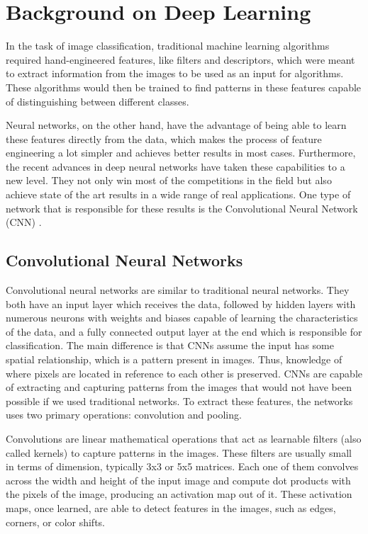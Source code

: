 \chapter{Background on Deep Learning}

In the task of image classification, traditional machine learning algorithms required hand-engineered features, like filters and descriptors, which were meant to extract information from the images to be used as an input for algorithms. These algorithms would then be trained to find patterns in these features capable of distinguishing between different classes.

Neural networks, on the other hand, have the advantage of being able to learn these features directly from the data, which makes the process of feature engineering a lot simpler and achieves better results in most cases. Furthermore, the recent advances in deep neural networks have taken these capabilities to a new level. They not only win most of the competitions in the field but also achieve state of the art results in a wide range of real applications. One type of network that is responsible for these results is the Convolutional Neural Network (CNN) \citep{Lecun1998}.

\section{Convolutional Neural Networks}

Convolutional neural networks are similar to traditional neural networks. They both have an input layer which receives the data, followed by hidden layers with numerous neurons with weights and biases capable of learning the characteristics of the data, and a fully connected output layer at the end which is responsible for classification. The main difference is that CNNs assume the input has some spatial relationship, which is a pattern present in images. Thus, knowledge of where pixels are located in reference to each other is preserved. CNNs are capable of extracting and capturing patterns from the images that would not have been possible if we used traditional networks. To extract these features, the networks uses two primary operations: convolution and pooling.

Convolutions are linear mathematical operations that act as learnable filters (also called kernels) to capture patterns in the images. These filters are usually small in terms of dimension, typically 3x3 or 5x5 matrices. Each one of them convolves across the width and height of the input image and compute dot products with the pixels of the image, producing an activation map out of it. These activation maps, once learned, are able to detect features in the images, such as edges, corners, or color shifts. 

